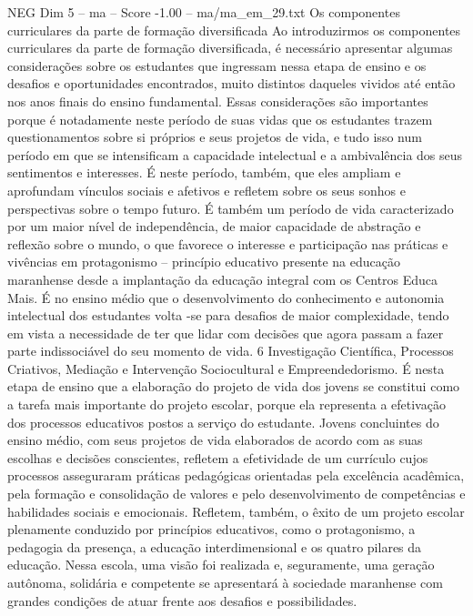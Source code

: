 \begin{textsample}{NEG Dim 5 – ma – Score -1.00 – ma/ma\_em\_29.txt}  \label{ex:f5_neg_112}
Os componentes curriculares da parte de formação diversificada Ao introduzirmos os componentes curriculares da parte de formação diversificada, é necessário apresentar algumas considerações sobre os estudantes que ingressam nessa etapa de ensino e os desafios e oportunidades encontrados, muito distintos daqueles vividos até então nos anos finais do ensino fundamental.
Essas considerações são importantes porque é notadamente neste período de suas vidas que os estudantes trazem questionamentos sobre si próprios e seus projetos de vida, e tudo isso num período em que se intensificam a capacidade intelectual e a ambivalência dos seus sentimentos e interesses.
É neste período, também, que eles ampliam e aprofundam vínculos sociais e afetivos e refletem sobre os seus sonhos e perspectivas sobre o tempo futuro.
É também um período de vida caracterizado por um maior nível de independência, de maior capacidade de abstração e reflexão sobre o mundo, o que favorece o interesse e participação nas práticas e vivências em protagonismo – princípio educativo presente na educação maranhense desde a implantação da educação integral com os Centros Educa Mais.
É no ensino médio que o desenvolvimento do conhecimento e autonomia intelectual dos estudantes volta -se para desafios de maior complexidade, tendo em vista a necessidade de ter que lidar com decisões que agora passam a fazer parte indissociável do seu momento de vida. 6 Investigação Científica, Processos Criativos, Mediação e Intervenção Sociocultural e Empreendedorismo.
É nesta etapa de ensino que a elaboração do projeto de vida dos jovens se constitui como a tarefa mais importante do projeto escolar, porque ela representa a efetivação dos processos educativos postos a serviço do estudante.
Jovens concluintes do ensino médio, com seus projetos de vida elaborados de acordo com as suas escolhas e decisões conscientes, refletem a efetividade de um currículo cujos processos asseguraram práticas pedagógicas orientadas pela excelência acadêmica, pela formação e consolidação de valores e pelo desenvolvimento de competências e habilidades sociais e emocionais.
Refletem, também, o êxito de um projeto escolar plenamente conduzido por princípios educativos, como o protagonismo, a pedagogia da presença, a educação interdimensional e os quatro pilares da educação.
Nessa escola, uma visão foi realizada e, seguramente, uma geração autônoma, solidária e competente se apresentará à sociedade maranhense com grandes condições de atuar frente aos desafios e possibilidades.

\end{textsample}
